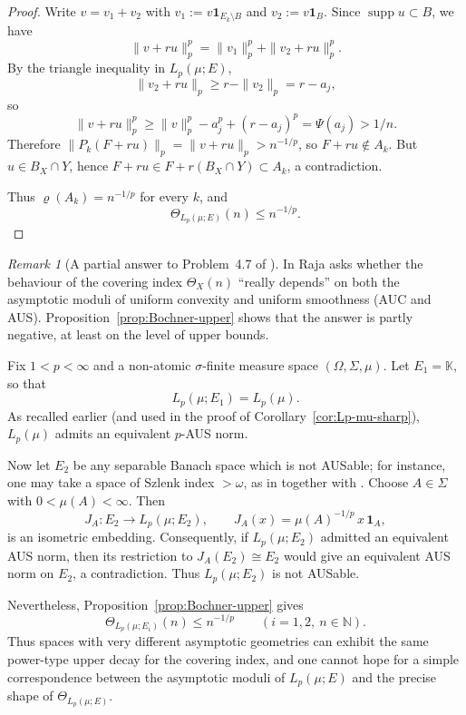 \documentclass[reqno,11pt]{amsart}
\theoremstyle{plain}
\theoremstyle{definition}
\theoremstyle{remark}
\newtheorem{remark}[theorem]{Remark}
\newcommand{\K}{\mathbb{K}}
\renewcommand{\le}{\leqslant}
\renewcommand{\ge}{\geqslant}
\begin{document}
\begin{proof}
Write $v=v_1+v_2$ with $v_1:=v\mathbf{1}_{E_k\setminus B}$ and
$v_2:=v\mathbf{1}_B$.  Since $\operatorname{supp} u\subset B$, we have
\[
\|v+ru\|_p^p = \|v_1\|_p^p + \|v_2+ru\|_p^p.
\]
By the triangle inequality in $L_p(\mu;E)$,
\[
\|v_2+ru\|_p \ge r - \|v_2\|_p = r - a_j,
\]
so
\[
\|v+ru\|_p^p
\ge \|v\|_p^p - a_j^p + (r-a_j)^p = \Psi(a_j)>1/n.
\]
Therefore $\|P_k(F+ru)\|_p = \|v+ru\|_p > n^{-1/p}$, so $F+ru\notin A_k$.
But $u\in B_X\cap Y$, hence $F+ru\in F+r(B_X\cap Y)\subset A_k$, a
contradiction.

Thus $\varrho(A_k)=n^{-1/p}$ for every $k$, and
\[
\Theta_{L_p(\mu;E)}(n)\le n^{-1/p}.
\]
\end{proof}

\begin{remark}[A partial answer to Problem~4.7 of \cite{RajaCoveringIndex}]\label{rmk:Problem47}
In \cite[Problem~4.7]{RajaCoveringIndex} Raja asks whether the behaviour of the
covering index $\Theta_X(n)$ ``really depends'' on both the asymptotic moduli
of uniform convexity and uniform smoothness (AUC and AUS).
Proposition~\ref{prop:Bochner-upper} shows that the answer is partly negative,
at least on the level of upper bounds.

Fix $1<p<\infty$ and a non-atomic $\sigma$-finite measure space
$(\Omega,\Sigma,\mu)$. Let $E_1=\K$, so that
\[
L_p(\mu;E_1)=L_p(\mu).
\]
As recalled earlier (and used in the proof of
Corollary~\ref{cor:Lp-mu-sharp}), $L_p(\mu)$ admits an equivalent $p$-AUS
norm.

Now let $E_2$ be any separable Banach space which is not AUSable; for
instance, one may take a space of Szlenk index $>\omega$, as in
\cite{OdellSchlumprechtZsak2009} together with
\cite{KnaustOdellSchlumprecht1999,RajaAUS,LancienSzlenkSurvey}.
Choose $A\in\Sigma$ with $0<\mu(A)<\infty$. Then
\[
J_A\colon E_2\longrightarrow L_p(\mu;E_2),\qquad
J_A(x)=\mu(A)^{-1/p}\,x\,\mathbf 1_A,
\]
is an isometric embedding. Consequently, if $L_p(\mu;E_2)$ admitted an
equivalent AUS norm, then its restriction to $J_A(E_2)\cong E_2$ would give
an equivalent AUS norm on $E_2$, a contradiction. Thus $L_p(\mu;E_2)$ is
not AUSable.

Nevertheless, Proposition~\ref{prop:Bochner-upper} gives
\[
\Theta_{L_p(\mu;E_i)}(n)\le n^{-1/p}
\qquad(i=1,2,\ n\in\mathbb N).
\]
Thus spaces with very different asymptotic geometries can exhibit the same
power-type upper decay for the covering index, and one cannot hope for a
simple correspondence between the asymptotic moduli of $L_p(\mu;E)$ and the
precise shape of $\Theta_{L_p(\mu;E)}$.
\end{remark}
\end{document}
